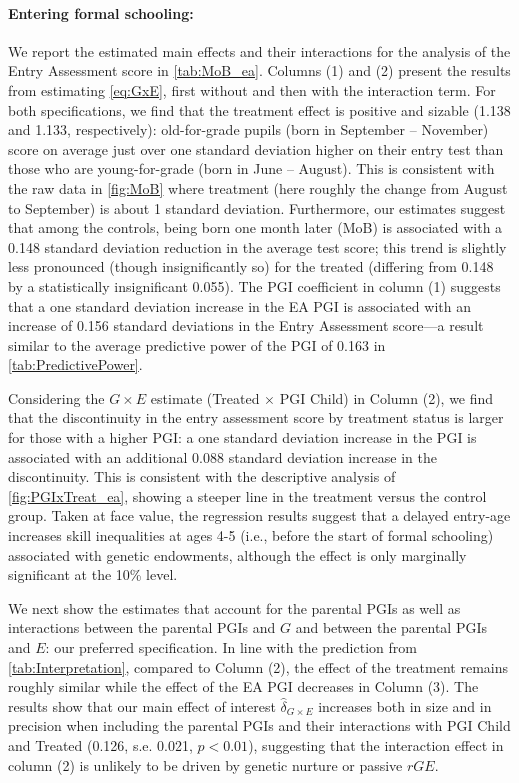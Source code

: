 \documentclass[12pt,a4paper]{article}
\begin{document}
\begin{bibunit}
\paragraph{Entering formal schooling:} 
We report the estimated main effects and their interactions for the analysis of the Entry Assessment score in \autoref{tab:MoB_ea}. Columns (1) and (2) present the results from estimating \autoref{eq:GxE}, first without and then with the interaction term. For both specifications, we find that the treatment effect is positive and sizable (1.138 and 1.133, respectively): old-for-grade pupils (born in September -- November) score on average just over one standard deviation higher on their entry test than those who are young-for-grade (born in June -- August). This is consistent with the raw data in \autoref{fig:MoB} where treatment (here roughly the change from August to September) is about 1 standard deviation. Furthermore, our estimates suggest that among the controls, being born one month later (MoB) is associated with a 0.148 standard deviation reduction in the average test score; this trend is slightly less pronounced (though insignificantly so) for the treated (differing from 0.148 by a statistically insignificant 0.055). The PGI coefficient in column (1) suggests that a one standard deviation increase in the EA PGI is associated with an increase of 0.156 standard deviations in the Entry Assessment score---a result similar to the average predictive power of the PGI of 0.163 in \autoref{tab:PredictivePower}.

Considering the $G \times E$ estimate (Treated $\times$ PGI Child) in Column (2), we find that the discontinuity in the entry assessment score by treatment status is larger for those with a higher PGI: a one standard deviation increase in the PGI is associated with an additional 0.088 standard deviation increase in the discontinuity. This is consistent with the descriptive analysis of \autoref{fig:PGIxTreat_ea}, showing a steeper line in the treatment versus the control group. Taken at face value, the regression results suggest that a delayed entry-age increases skill inequalities at ages 4-5 (i.e., before the start of formal schooling) associated with genetic endowments, although the effect is only marginally significant at the 10\% level.

We next show the estimates that account for the parental PGIs as well as interactions between the parental PGIs and $G$ and between the parental PGIs and $E$: our preferred specification. In line with the prediction from \autoref{tab:Interpretation}, compared to Column (2), the effect of the treatment remains roughly similar while the effect of the EA PGI decreases in Column (3). The results show that our main effect of interest $\hat{\delta}_{G \times E}$ increases both in size and in precision when including the parental PGIs and their interactions with PGI Child and Treated (0.126, s.e. 0.021, $p < 0.01$), suggesting that the interaction effect in column (2) is unlikely to be driven by genetic nurture or passive $rGE$.


\end{bibunit}
\end{document}
